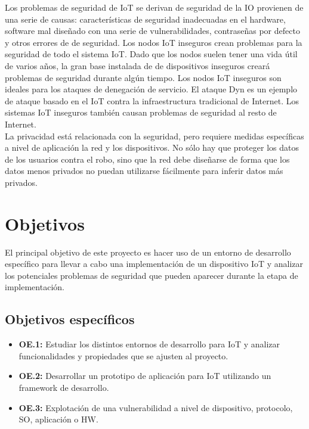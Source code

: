 {Los problemas de seguridad de IoT se derivan de seguridad de la IO provienen de una serie de causas: características de seguridad inadecuadas en el hardware, software mal diseñado con una serie de vulnerabilidades, contraseñas por defecto y otros errores de de seguridad. Los nodos IoT inseguros crean problemas para la seguridad de todo el sistema IoT. Dado que los nodos suelen tener una vida útil de varios años, la gran base instalada de de dispositivos inseguros creará problemas de seguridad durante algún tiempo. Los nodos IoT inseguros son ideales para los ataques de denegación de servicio. El ataque Dyn es un ejemplo de ataque basado en el IoT contra la infraestructura tradicional de Internet. Los sistemas IoT inseguros también causan problemas de seguridad al resto de Internet. \\

La privacidad está relacionada con la seguridad, pero requiere medidas específicas a nivel de aplicación la red y los dispositivos. No sólo hay que proteger los datos de los usuarios contra el robo, sino que la red debe diseñarse de forma que los datos menos privados no puedan utilizarse fácilmente para inferir datos más privados. \cite{serpanos2018internet} \\ 

\section{Objetivos} \label{sec:objetivos}

El principal objetivo de este proyecto es hacer uso de un entorno de desarrollo específico para llevar a cabo una implementación de un dispositivo IoT y analizar los potenciales problemas de seguridad que pueden aparecer durante la etapa de implementación.

\subsection{Objetivos específicos}

\begin{itemize}
    \item \textbf{OE.1:} Estudiar los distintos entornos de desarrollo para IoT y analizar funcionalidades y propiedades que se ajusten al proyecto.
    \item \textbf{OE.2:} Desarrollar un prototipo de aplicación para IoT utilizando un framework de desarrollo.
    \item \textbf{OE.3:} Explotación de una vulnerabilidad a nivel de dispositivo, protocolo, SO, aplicación o HW.
\end{itemize}

}